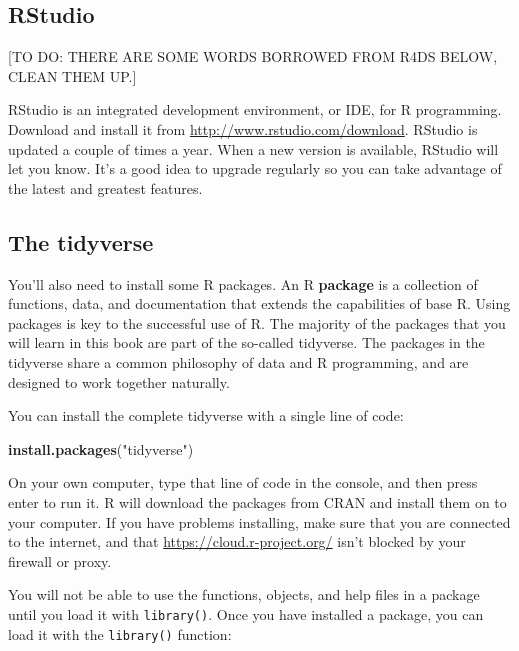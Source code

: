 \documentclass[]{book}
\newenvironment{Shaded}{\begin{snugshade}}{\end{snugshade}}
\newcommand{\KeywordTok}[1]{\textcolor[rgb]{0.13,0.29,0.53}{\textbf{#1}}}
\newcommand{\StringTok}[1]{\textcolor[rgb]{0.31,0.60,0.02}{#1}}
\newcommand{\NormalTok}[1]{#1}
\theoremstyle{definition}
\theoremstyle{definition}
\theoremstyle{definition}
\theoremstyle{remark}
\begin{document}
\subsection{RStudio}\label{rstudio}

{[}TO DO: THERE ARE SOME WORDS BORROWED FROM R4DS BELOW, CLEAN THEM
UP.{]}

RStudio is an integrated development environment, or IDE, for R
programming. Download and install it from
\url{http://www.rstudio.com/download}. RStudio is updated a couple of
times a year. When a new version is available, RStudio will let you
know. It's a good idea to upgrade regularly so you can take advantage of
the latest and greatest features.

\subsection{The tidyverse}\label{the-tidyverse}

You'll also need to install some R packages. An R \textbf{package} is a
collection of functions, data, and documentation that extends the
capabilities of base R. Using packages is key to the successful use of
R. The majority of the packages that you will learn in this book are
part of the so-called tidyverse. The packages in the tidyverse share a
common philosophy of data and R programming, and are designed to work
together naturally.

You can install the complete tidyverse with a single line of code:

\begin{Shaded}
\begin{Highlighting}[]
\KeywordTok{install.packages}\NormalTok{(}\StringTok{"tidyverse"}\NormalTok{)}
\end{Highlighting}
\end{Shaded}

On your own computer, type that line of code in the console, and then
press enter to run it. R will download the packages from CRAN and
install them on to your computer. If you have problems installing, make
sure that you are connected to the internet, and that
\url{https://cloud.r-project.org/} isn't blocked by your firewall or
proxy.

You will not be able to use the functions, objects, and help files in a
package until you load it with \texttt{library()}. Once you have
installed a package, you can load it with the \texttt{library()}
function:
\end{document}
